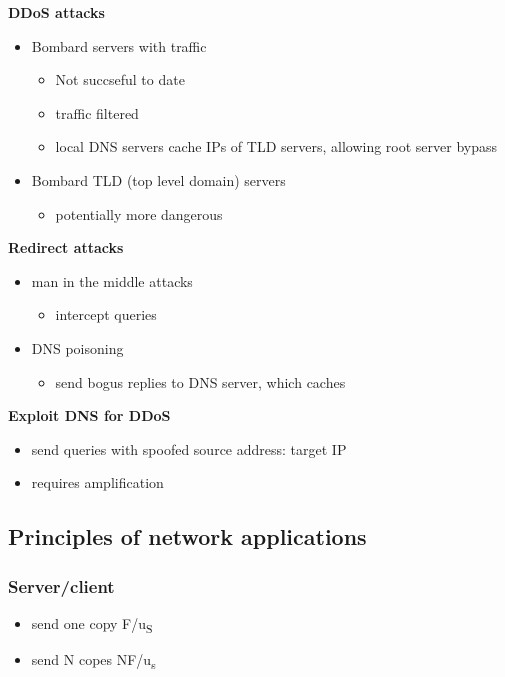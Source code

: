 \documentclass[11pt]{article}
\begin{document}
\textbf{DDoS attacks}
\begin{itemize}
\item Bombard servers with traffic
\begin{itemize}
\item Not succseful to date
\item traffic filtered
\item local DNS servers cache IPs of TLD servers, allowing root server
bypass
\end{itemize}
\item Bombard TLD (top level domain) servers
\begin{itemize}
\item potentially more dangerous
\end{itemize}
\end{itemize}

\textbf{Redirect attacks}
\begin{itemize}
\item man in the middle attacks
\begin{itemize}
\item intercept queries
\end{itemize}
\item DNS poisoning
\begin{itemize}
\item send bogus replies to DNS server, which caches
\end{itemize}
\end{itemize}

\textbf{Exploit DNS for DDoS}
\begin{itemize}
\item send queries with spoofed source address: target IP
\item requires amplification
\end{itemize}

\subsection{Principles of network applications}
\label{sec:org189379d}
\subsubsection{Server/client}
\label{sec:org038917d}
\begin{itemize}
\item send one copy F/u\textsubscript{S}
\item send N copes NF/u\textsubscript{s}
\end{itemize}
\end{document}
